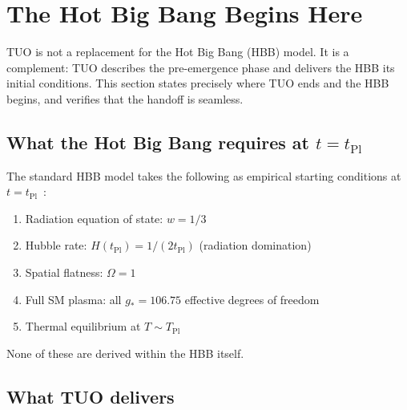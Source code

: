 \documentclass[12pt,a4paper]{article}
\theoremstyle{definition}
\theoremstyle{remark}
\newcommand{\tPl}{t_{\mathrm{Pl}}}
\newcommand{\TPl}{T_{\mathrm{Pl}}}
\newcommand{\gstar}{g_{*}}
\begin{document}
\section{The Hot Big Bang Begins Here}
\label{sec:hbb}

TUO is not a replacement for the Hot Big Bang (HBB) model.
It is a complement: TUO describes the pre-emergence phase and delivers
the HBB its initial conditions. This section states precisely where TUO
ends and the HBB begins, and verifies that the handoff is seamless.

\subsection{What the Hot Big Bang requires at $t = \tPl$}

The standard HBB model takes the following as empirical starting conditions
at $t = \tPl$~\cite{Weinberg2008,Kolb1990}:
\begin{enumerate}[leftmargin=2.5em,label=(\roman*)]
  \item Radiation equation of state: $w = 1/3$
  \item Hubble rate: $H(\tPl) = 1/(2\tPl)$ (radiation domination)
  \item Spatial flatness: $\Omega = 1$
  \item Full SM plasma: all $\gstar = 106.75$ effective degrees of freedom
  \item Thermal equilibrium at $T \sim \TPl$
\end{enumerate}
None of these are derived within the HBB itself.

\subsection{What TUO delivers}
\end{document}

